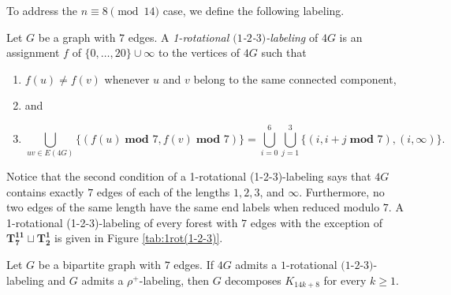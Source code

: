 \documentclass{dmgt}
\begin{document}
To address the $n \equiv 8 \pmod{14}$ case, we define the following labeling.
\begin{dnt}\label{def:1-2-3-1-rot}
    Let $G$ be a graph with $7$ edges. A \emph{1-rotational $(1$-$2$-$3)$-labeling} of $4G$ is an assignment $f$ of $\{0,\dots,20\} \cup \infty$ to the vertices of $4G$ such that
    \begin{enumerate}
        \item $f(u) \neq f(v)$ whenever $u$ and $v$ belong to the same connected component, 
        \item[] and
        \item  $$ \bigcup_{uv\in E(4G)} \{(f(u)\; \textbf{mod } 7,f(v)\; \textbf{mod } 7)\}= \bigcup_{i=0}^{6} \bigcup_{j=1}^{3} \{(i,i+j \; \textbf{mod } 7), (i,\infty)\}.$$
    \end{enumerate}
\end{dnt}
Notice that the second condition of a 1-rotational (1-2-3)-labeling says that $4G$ contains exactly $7$ edges of each of the lengths $1,2,3$, and $\infty$. Furthermore, no two edges of the same length have the same end labels when reduced modulo $7.$ A 1-rotational (1-2-3)-labeling of every forest with $7$ edges with the exception of $\mathbf{T_{7}^{11}}\sqcup\mathbf{T_{2}^{1}}$ is given in Figure \ref{tab:1rot(1-2-3)}. 

\begin{theorem}\label{thm:1-2-3 1-rot plus rho}
    Let $G$ be a bipartite graph with $7$ edges. If $4G$ admits a $1$-rotational  $(1$-$2$-$3)$-labeling and $G$ admits a $\rho^{+}$-labeling, then $G$ decomposes $K_{14k+8}$ for every $k\geq1.$
\end{theorem}
\end{document}
